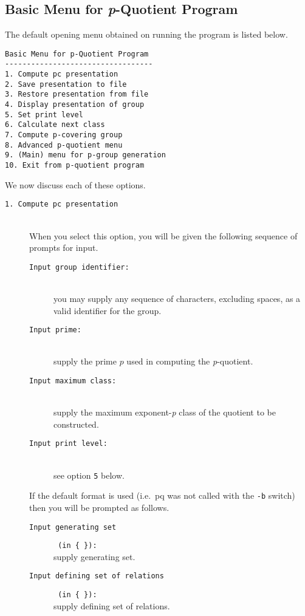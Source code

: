\documentclass[12pt]{article}
\begin{document}
\subsection{Basic Menu for {\it p}-Quotient Program}\label{sec:basic-menu}
The default opening menu obtained on running the program is listed below.
\begin{verbatim}
Basic Menu for p-Quotient Program
----------------------------------
1. Compute pc presentation
2. Save presentation to file
3. Restore presentation from file
4. Display presentation of group
5. Set print level
6. Calculate next class
7. Compute p-covering group
8. Advanced p-quotient menu
9. (Main) menu for p-group generation
10. Exit from p-quotient program
\end{verbatim}
We now discuss each of these options.
\begin{description}
\item[\texttt{1.\ Compute pc presentation}]\ \\ 
 When you select this option, you will be given the following sequence
 of prompts for input.
 \begin{description}
 \item[\texttt{Input group identifier:}]\ \\
  you may supply any sequence of characters, 
  excluding spaces, as a valid identifier for the group.
 \item[\texttt{Input prime:}]\ \\
  supply the prime $p$ used in computing the {\it p}-quotient.
 \item[\texttt{Input maximum class:}]\ \\
  supply the maximum exponent-{\it p} class of the quotient to be constructed.
 \item[\texttt{Input print level:}]\ \\
  see option \texttt{5} below.
 \end{description}
 If the default format is used (i.e.\ pq was not called with the \texttt{-b}
 switch) then you will be prompted as follows.
 \begin{description}
 \item[\texttt{Input generating set}]\hspace*{-0.5em}\verb| (in { }):|\\
  supply generating set. 
 \item[\texttt{Input defining set of relations}]\hspace*{-0.5em}\verb| (in { }):|\\
  supply defining set of relations.

\end{description}
\end{description}
\end{document}
